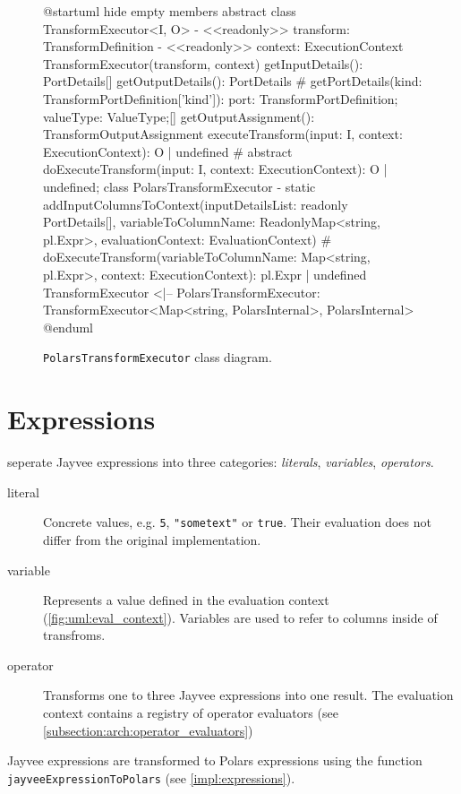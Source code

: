 \begin{figure}
	\begin{plantuml}
		@startuml
		hide empty members
		abstract class TransformExecutor<I, O> {
		- <<readonly>> transform: TransformDefinition
		- <<readonly>> context: ExecutionContext
		TransformExecutor(transform, context)
		getInputDetails(): PortDetails[]
		getOutputDetails(): PortDetails
		# getPortDetails(kind: TransformPortDefinition['kind']): { port: TransformPortDefinition; valueType: ValueType;}[]
		getOutputAssignment(): TransformOutputAssignment
		executeTransform(input: I, context: ExecutionContext): O | undefined
		# {abstract} doExecuteTransform(input: I, context: ExecutionContext): O | undefined;
		}
		class PolarsTransformExecutor  {
		- {static} addInputColumnsToContext(inputDetailsList: readonly PortDetails[], variableToColumnName: ReadonlyMap<string, pl.Expr>, evaluationContext: EvaluationContext)
		# doExecuteTransform(variableToColumnName: Map<string, pl.Expr>, context: ExecutionContext): pl.Expr | undefined
		}
		TransformExecutor <|-- PolarsTransformExecutor: TransformExecutor<Map<string, PolarsInternal>, PolarsInternal>
		@enduml
	\end{plantuml}
	\caption{\Verb|PolarsTransformExecutor| class diagram.}
	\label{fig:uml:transformexecutor}
\end{figure}

\section{Expressions}
\label{section:expressions}
\textcite{polars:docs:expr} seperate Jayvee expressions into three categories: \emph{literals}, \emph{variables}, \emph{operators}.
\begin{description}
	\item[literal] Concrete values, e.g. \Verb|5|, \Verb|"sometext"| or \Verb|true|.
	      Their evaluation does not differ from the original implementation.
	\item[variable] Represents a value defined in the evaluation context (\ref{fig:uml:eval_context}).
	      Variables are used to refer to columns inside of transfroms.
	\item[operator] Transforms one to three Jayvee expressions into one result.
	      The evaluation context contains a registry of operator evaluators (see \ref{subsection:arch:operator_evaluators})
\end{description}
Jayvee expressions are transformed to Polars expressions using the function \Verb|jayveeExpressionToPolars| (see \ref{impl:expressions}).


